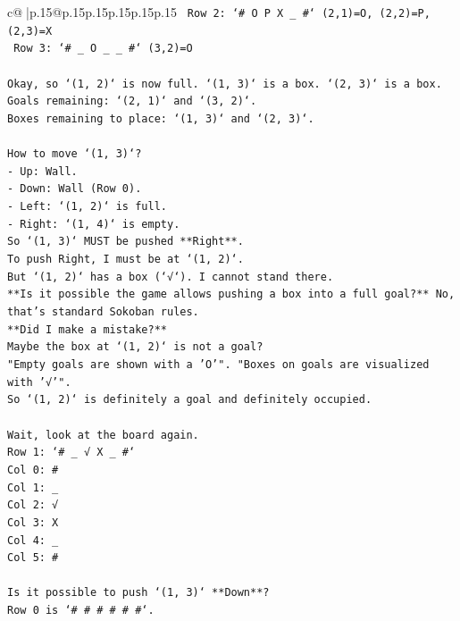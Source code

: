 \documentclass{article}
\begin{document}
{\begin{supertabular}{c@{$\;$}|p{.15\linewidth}@{}p{.15\linewidth}p{.15\linewidth}p{.15\linewidth}p{.15\linewidth}p{.15\linewidth}}
{{{\texttt{     Row 2: `\# O P X \_ \#` (2,1)=O, (2,2)=P, (2,3)=X} \\
\texttt{     Row 3: `\# \_ O \_ \_ \#` (3,2)=O} \\
\\ 
\texttt{Okay, so `(1, 2)` is now full. `(1, 3)` is a box. `(2, 3)` is a box.} \\
\texttt{Goals remaining: `(2, 1)` and `(3, 2)`.} \\
\texttt{Boxes remaining to place: `(1, 3)` and `(2, 3)`.} \\
\\ 
\texttt{How to move `(1, 3)`?} \\
\texttt{{-} Up: Wall.} \\
\texttt{{-} Down: Wall (Row 0).} \\
\texttt{{-} Left: `(1, 2)` is full.} \\
\texttt{{-} Right: `(1, 4)` is empty.} \\
\texttt{So `(1, 3)` MUST be pushed **Right**.} \\
\texttt{To push Right, I must be at `(1, 2)`.} \\
\texttt{But `(1, 2)` has a box (`√`). I cannot stand there.} \\
\texttt{**Is it possible the game allows pushing a box into a full goal?** No, that's standard Sokoban rules.} \\
\texttt{**Did I make a mistake?**} \\
\texttt{Maybe the box at `(1, 2)` is not a goal?} \\
\texttt{"Empty goals are shown with a 'O'". "Boxes on goals are visualized with '√'".} \\
\texttt{So `(1, 2)` is definitely a goal and definitely occupied.} \\
\\ 
\texttt{Wait, look at the board again.} \\
\texttt{Row 1: `\# \_ √ X \_ \#`} \\
\texttt{Col 0: \#} \\
\texttt{Col 1: \_} \\
\texttt{Col 2: √} \\
\texttt{Col 3: X} \\
\texttt{Col 4: \_} \\
\texttt{Col 5: \#} \\
\\ 
\texttt{Is it possible to push `(1, 3)` **Down**?} \\
\texttt{Row 0 is `\# \# \# \# \# \#`.} \\
}}}
\end{supertabular}}
\end{document}
